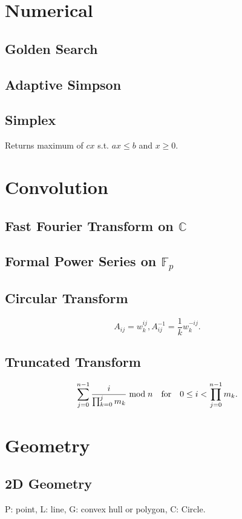 \documentclass{article}
\begin{document}
\begin{multicols}{2}
    \section{Numerical}
    \subsection{Golden Search}
    
    \subsection{Adaptive Simpson}
    
    \subsection{Simplex}
    Returns maximum of $cx$ s.t. $ax\le b$ and $x\ge 0$.
    
    

    \section{Convolution}
    \subsection{Fast Fourier Transform on $\mathbb{C}$}
    
    \subsection{Formal Power Series on $\mathbb{F}_p$}
    
    
    \subsection{Circular Transform}
    $$A_{ij}=w_k^{ij}, A^{-1}_{ij}=\frac{1}{k}w_k^{-ij}.$$
    \subsection{Truncated Transform}
    $$\sum_{j=0}^{n-1}\frac{i}{\prod_{k=0}^{j}m_k}\bmod n\quad{\rm for}\quad 0\le i < \prod_{j=0}^{n-1}m_k.$$

    \section{Geometry}
    
    \subsection{2D Geometry}
    P: point, L: line, G: convex hull or polygon, C: Circle.
    

\end{multicols}
\end{document}
